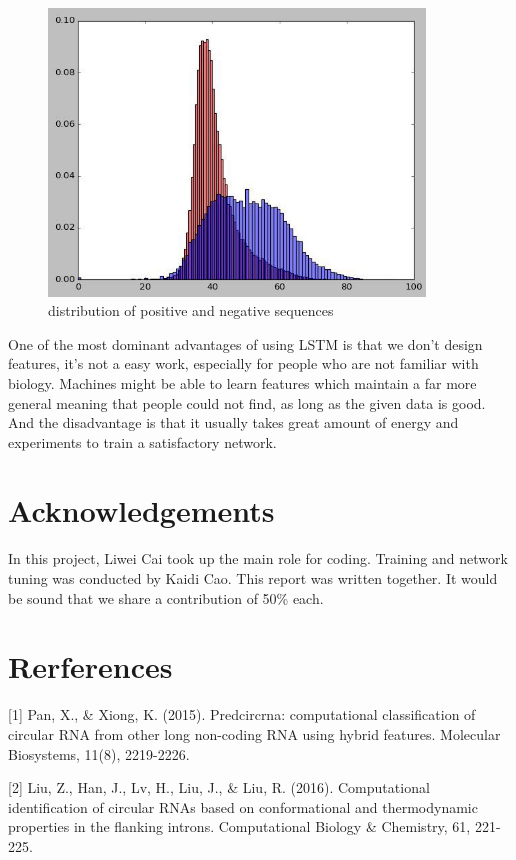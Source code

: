 \documentclass[10pt,a4paper]{article}
\begin{document}
\begin{spacing}{1.5}
		\begin{figure}[H]
			\centering
			\includegraphics[width = 10cm]{pic/2.jpg}
			\caption{distribution of positive and negative sequences}
		\end{figure}
		
		One of the most dominant advantages of using LSTM is that we don't design features, it's not a easy work, especially for people who are not familiar with biology. Machines might be able to learn features which maintain a far more general meaning that people could not find, as long as the given data is good. And the disadvantage is that it usually takes great amount of energy and experiments to train a satisfactory network.
		
		\section*{Acknowledgements}
		In this project, Liwei Cai took up the main role for coding. Training and network tuning was conducted by Kaidi Cao. This report was written together. It would be sound that we share a contribution of 50\% each. 
		
		
		\newpage
		
		\section*{Rerferences}
		
		[1] Pan, X., \& Xiong, K. (2015). Predcircrna: computational classification of circular RNA from other long non-coding RNA using hybrid features. Molecular Biosystems, 11(8), 2219-2226.
		
		[2] Liu, Z., Han, J., Lv, H., Liu, J., \& Liu, R. (2016). Computational identification of circular RNAs based on conformational and thermodynamic properties in the flanking introns. Computational Biology \& Chemistry, 61, 221-225.
		

\end{spacing}
\end{document}
